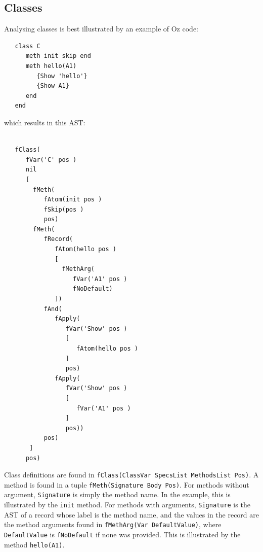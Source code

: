 \documentclass[a4paper]{memoir}
\begin{document}
\subsection{Classes}
Analysing classes is best illustrated by an example of Oz code:

\begin{lstlisting}
   class C
      meth init skip end
      meth hello(A1)
         {Show 'hello'}
         {Show A1}
      end
   end
\end{lstlisting}
which results in this AST:
\begin{lstlisting}

   fClass(
      fVar('C' pos )
      nil
      [
        fMeth(
           fAtom(init pos )
           fSkip(pos )
           pos)
        fMeth(
           fRecord(
              fAtom(hello pos )
              [
                fMethArg(
                   fVar('A1' pos )
                   fNoDefault)
              ])
           fAnd(
              fApply(
                 fVar('Show' pos )
                 [
                    fAtom(hello pos )
                 ]
                 pos)
              fApply(
                 fVar('Show' pos )
                 [
                    fVar('A1' pos )
                 ]
                 pos))
           pos)
       ]
      pos)
\end{lstlisting}

Class definitions are found in 
\lstinline!fClass(ClassVar SpecsList MethodsList Pos)!.
A method is found in a tuple \lstinline!fMeth(Signature Body Pos)!.
For methods without argument, \lstinline!Signature! is simply the method name.
In the example, this is illustrated by the \lstinline!init! method.
For methods with arguments, \lstinline!Signature! is the AST of a record whose label is the method name, and the
values in the record are the method arguments found in 
\lstinline!fMethArg(Var DefaultValue)!, where \lstinline!DefaultValue! is
\lstinline!fNoDefault! if none was provided.
This is illustrated by the method \lstinline!hello(A1)!.
\end{document}
